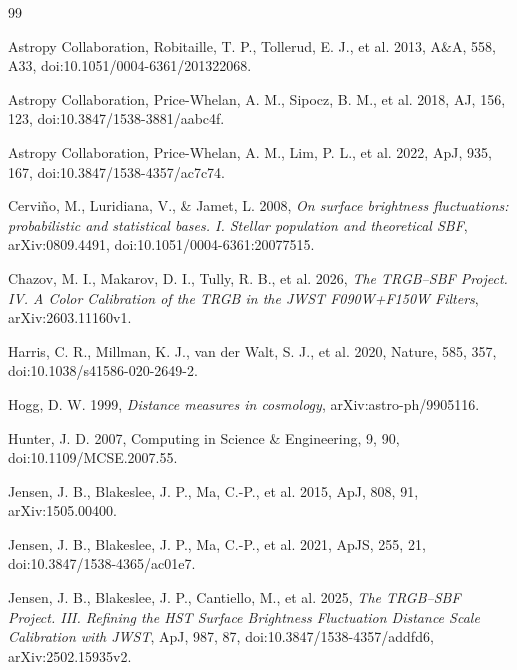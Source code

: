\documentclass[nodoi,nocopyright]{pas}
\begin{document}
\FloatBarrier
\begin{thebibliography}{99}

Astropy Collaboration, Robitaille, T. P., Tollerud, E. J., et al. 2013,
A\&A, 558, A33, doi:10.1051/0004-6361/201322068.

Astropy Collaboration, Price-Whelan, A. M., Sipocz, B. M., et al. 2018,
AJ, 156, 123, doi:10.3847/1538-3881/aabc4f.

Astropy Collaboration, Price-Whelan, A. M., Lim, P. L., et al. 2022,
ApJ, 935, 167, doi:10.3847/1538-4357/ac7c74.

Cervi\~no, M., Luridiana, V., \& Jamet, L. 2008,
\emph{On surface brightness fluctuations: probabilistic and statistical
bases. I. Stellar population and theoretical SBF},
arXiv:0809.4491, doi:10.1051/0004-6361:20077515.

Chazov, M. I., Makarov, D. I., Tully, R. B., et al. 2026,
\emph{The TRGB--SBF Project. IV. A Color Calibration of the TRGB in the
JWST F090W+F150W Filters}, arXiv:2603.11160v1.

Harris, C. R., Millman, K. J., van der Walt, S. J., et al. 2020,
Nature, 585, 357, doi:10.1038/s41586-020-2649-2.

Hogg, D. W. 1999, \emph{Distance measures in cosmology},
arXiv:astro-ph/9905116.

Hunter, J. D. 2007, Computing in Science \& Engineering, 9, 90,
doi:10.1109/MCSE.2007.55.

Jensen, J. B., Blakeslee, J. P., Ma, C.-P., et al. 2015,
ApJ, 808, 91, arXiv:1505.00400.

Jensen, J. B., Blakeslee, J. P., Ma, C.-P., et al. 2021,
ApJS, 255, 21, doi:10.3847/1538-4365/ac01e7.

Jensen, J. B., Blakeslee, J. P., Cantiello, M., et al. 2025,
\emph{The TRGB--SBF Project. III. Refining the HST Surface Brightness
Fluctuation Distance Scale Calibration with JWST},
ApJ, 987, 87, doi:10.3847/1538-4357/addfd6, arXiv:2502.15935v2.


\end{thebibliography}
\end{document}
